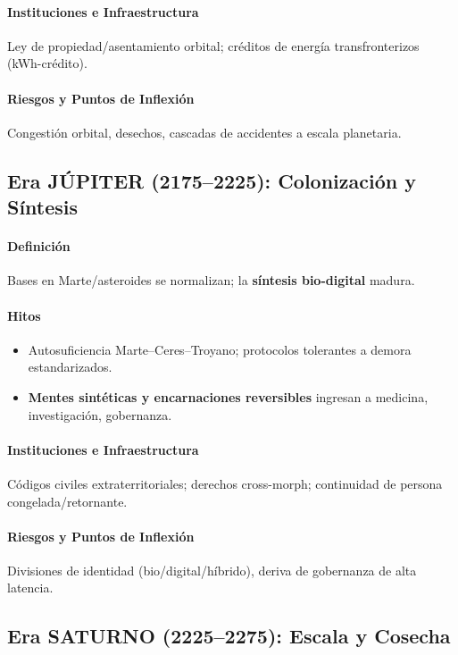 \documentclass[11pt]{article}
\begin{document}
\paragraph{Instituciones e Infraestructura} Ley de propiedad/asentamiento orbital; créditos de energía transfronterizos (kWh-crédito).

\paragraph{Riesgos y Puntos de Inflexión} Congestión orbital, desechos, cascadas de accidentes a escala planetaria.

\subsection{Era JÚPITER (2175–2225): Colonización y Síntesis}
\paragraph{Definición} Bases en Marte/asteroides se normalizan; la \textbf{síntesis bio-digital} madura.

\paragraph{Hitos}
\begin{itemize}[noitemsep]
  \item Autosuficiencia Marte–Ceres–Troyano; protocolos tolerantes a demora estandarizados.
  \item \textbf{Mentes sintéticas y encarnaciones reversibles} ingresan a medicina, investigación, gobernanza.
\end{itemize}

\paragraph{Instituciones e Infraestructura} Códigos civiles extraterritoriales; derechos cross-morph; continuidad de persona congelada/retornante.

\paragraph{Riesgos y Puntos de Inflexión} Divisiones de identidad (bio/digital/híbrido), deriva de gobernanza de alta latencia.

\subsection{Era SATURNO (2225–2275): Escala y Cosecha}
\end{document}
